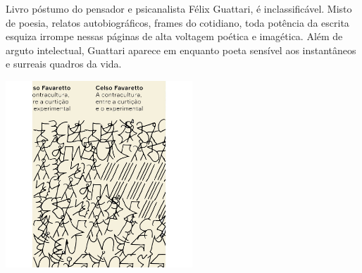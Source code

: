 \medskip

\noindent{}Livro póstumo do pensador e psicanalista Félix Guattari, {} é inclassificável. Misto de poesia, relatos autobiográficos, frames do cotidiano, toda potência da escrita esquiza irrompe nessas páginas de alta voltagem poética e imagética. Além de arguto intelectual, Guattari aparece em {} enquanto poeta sensível aos instantâneos e surreais quadros da vida.

\vfill

\hspace*{-.4cm}\begin{minipage}[c]{1\linewidth}
\small{
{}}
\end{minipage}

\pagebreak

\hspace{.5cm}

\begin{center}
\hspace*{-1cm}
\hspace*{1cm}\includegraphics[width=70mm]{./grid/favaretto.jpeg}
\end{center}

\hspace*{-7cm}\hrulefill\hspace*{-7cm}

